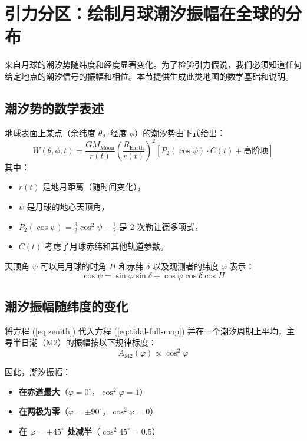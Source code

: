 \documentclass[12pt,a4paper]{article}
\theoremstyle{remark}
\begin{document}
	\section{引力分区：绘制月球潮汐振幅在全球的分布}
	\label{sec:map}
	
	来自月球的潮汐势随纬度和经度显著变化。为了检验引力假说，我们必须知道任何给定地点的潮汐信号的振幅和相位。本节提供生成此类地图的数学基础和说明。
	
	\subsection{潮汐势的数学表述}
	
	地球表面上某点（余纬度 \(\theta\)，经度 \(\phi\)）的潮汐势由下式给出：
	\begin{equation}
		W(\theta, \phi, t) = \frac{GM_{\text{Moon}}}{r(t)} \left(\frac{R_{\text{Earth}}}{r(t)}\right)^2 \left[ P_2(\cos\psi) \cdot C(t) + \text{高阶项} \right]
		\label{eq:tidal-full-map}
	\end{equation}
	其中：
	\begin{itemize}
		\item \(r(t)\) 是地月距离（随时间变化），
		\item \(\psi\) 是月球的地心天顶角，
		\item \(P_2(\cos\psi) = \frac{3}{2}\cos^2\psi - \frac{1}{2}\) 是 2 次勒让德多项式，
		\item \(C(t)\) 考虑了月球赤纬和其他轨道参数。
	\end{itemize}
	
	天顶角 \(\psi\) 可以用月球的时角 \(H\) 和赤纬 \(\delta\) 以及观测者的纬度 \(\varphi\) 表示：
	\begin{equation}
		\cos\psi = \sin\varphi \sin\delta + \cos\varphi \cos\delta \cos H
		\label{eq:zenith}
	\end{equation}
	
	\subsection{潮汐振幅随纬度的变化}
	
	将方程 (\ref{eq:zenith}) 代入方程 (\ref{eq:tidal-full-map}) 并在一个潮汐周期上平均，主导半日潮（M2）的振幅按以下规律标度：
	\begin{equation}
		A_{\text{M2}}(\varphi) \propto \cos^2\varphi
		\label{eq:amplitude-latitude}
	\end{equation}
	
	因此，潮汐振幅：
	\begin{itemize}
		\item \textbf{在赤道最大}（\(\varphi = 0^\circ\)，\(\cos^2\varphi = 1\)）
		\item \textbf{在两极为零}（\(\varphi = \pm 90^\circ\)，\(\cos^2\varphi = 0\)）
		\item \textbf{在 \(\varphi = \pm 45^\circ\) 处减半}（\(\cos^2 45^\circ = 0.5\)）
	\end{itemize}
	
\end{document}
